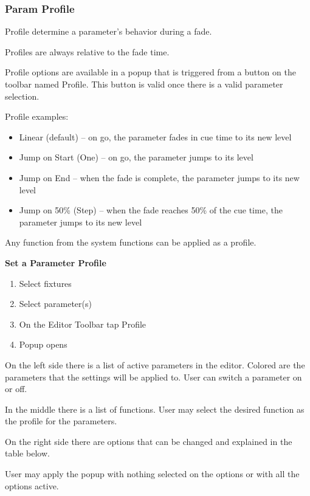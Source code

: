 \documentclass[
]{article}
\begin{document}
\hypertarget{param-profile}{%
\subsubsection{Param Profile}\label{param-profile}}

Profile determine a parameter's behavior during a fade.

Profiles are always relative to the fade time.

Profile options are available in a popup that is triggered from a button on the toolbar named Profile. This button is valid once there is a valid parameter selection.

Profile examples:

\begin{itemize}
\item
  Linear (default) -- on go, the parameter fades in cue time to its new level
\item
  Jump on Start (One) -- on go, the parameter jumps to its level
\item
  Jump on End -- when the fade is complete, the parameter jumps to its new level
\item
  Jump on 50\% (Step) -- when the fade reaches 50\% of the cue time, the parameter jumps to its new level
\end{itemize}

Any function from the system functions can be applied as a profile.

\textbf{Set a Parameter Profile}

\begin{enumerate}
\def\labelenumi{\arabic{enumi}.}
\item
  Select fixtures
\item
  Select parameter(s)
\item
  On the Editor Toolbar tap Profile
\item
  Popup opens
\end{enumerate}

On the left side there is a list of active parameters in the editor. Colored are the parameters that the settings will be applied to. User can switch a parameter on or off.

In the middle there is a list of functions. User may select the desired function as the profile for the parameters.

On the right side there are options that can be changed and explained in the table below.

User may apply the popup with nothing selected on the options or with all the options active.
\end{document}
